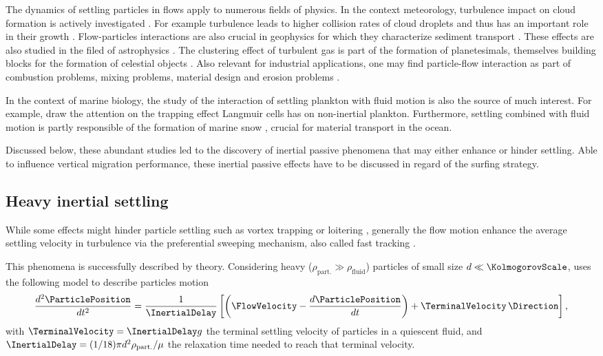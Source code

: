 The dynamics of settling particles in flows apply to numerous fields of physics.
In the context meteorology, turbulence impact on cloud formation is actively investigated \citep{vaillancourt2000review}.
For example turbulence leads to higher collision rates of cloud droplets and thus has an important role in their growth \citep{devenish2012droplet}.
Flow-particles interactions are also crucial in geophysics for which they characterize sediment transport \citep{kok2012physics, wallwork2022review}. 
These effects are also studied in the filed of astrophysics \citep{volk1980collisions}.
The clustering effect of turbulent gas is part of the formation of planetesimals, themselves building blocks for the formation of celestial objects \citep{volk1980collisions, johansen2014multifaceted, hartlep2020cascade}.
Also relevant for industrial applications, one may find particle-flow interaction as part of combustion problems, mixing problems, material design and erosion problems \citep{balachandar2010turbulent, silva2015settling, gustavsson2016statistical}.

In the context of marine biology, the study of the interaction of settling plankton with fluid motion is also the source of much interest.
For example, \citet{stommel1949trajectories} draw the attention on the trapping effect Langmuir cells has on non-inertial plankton.
Furthermore, settling combined with fluid motion is partly responsible of the formation of marine snow \citep{alldredge1990particle}, crucial for material transport in the ocean.

Discussed below, these abundant studies led to the discovery of inertial passive phenomena that may either enhance or hinder settling.
Able to influence vertical migration performance, these inertial passive effects have to be discussed in regard of the surfing strategy.

\subsection{Heavy inertial settling}

While some effects might hinder particle settling such as vortex trapping \citep{tooby1977motion} or loitering \citep{nielsen1993turbulence}, generally the flow motion enhance the average
settling velocity in turbulence via the preferential sweeping mechanism, also called fast tracking \citep{nielsen1993turbulence}.

This phenomena is successfully described by \citet{maxey1986gravitational} theory.
Considering heavy ($\rho_{\mathrm{part.}} \gg \rho_{\mathrm{fluid}}$) particles of small size $d \ll \KolmogorovScale$, \citet{maxey1986gravitational} uses the following model to describe particles motion
\begin{equation}\label{eq:inertial_motion}
	\frac{d^2 \ParticlePosition}{dt^2} = \frac{1}{\InertialDelay} \left[ \left(\FlowVelocity - \frac{d \ParticlePosition}{dt} \right) + \TerminalVelocity \, \Direction \right],
\end{equation}
with $\TerminalVelocity = \InertialDelay g$ the terminal settling velocity of particles in a quiescent fluid, and $\InertialDelay = (1/18) \pi d^2 \rho_{\mathrm{part.}} / \mu$ the relaxation time needed to reach that terminal velocity.

